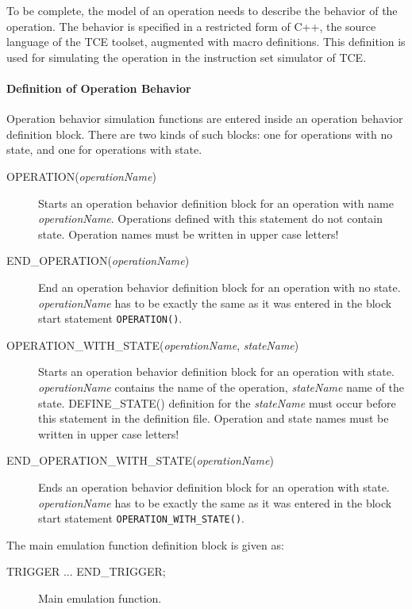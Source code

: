 \documentclass[twoside]{tceusermanual}
\begin{document}
To be complete, the model of an operation needs to describe the
behavior of the operation. The behavior is specified in a restricted
form of C++, the source language of the TCE toolset, augmented with
macro definitions.  This definition is used for simulating the
operation in the instruction set simulator of TCE.

\paragraph{Definition of Operation Behavior}

Operation behavior simulation functions are entered inside an operation
behavior definition block. There are two kinds of such blocks: one for
operations with no state, and one for operations with state.

\begin{description}
\item[OPERATION(\emph{operationName})] %
  Starts an operation behavior definition block for an operation with name 
  \emph{operationName}. Operations defined with this statement do not 
  contain state. Operation names must be written in upper case letters!
\item[END\_OPERATION(\emph{operationName})] %
  End an operation behavior definition block for an operation with no state.
  \emph{operationName} has to be exactly the same as it was entered in the
  block start statement \verb|OPERATION()|.
\item[OPERATION\_WITH\_STATE(\emph{operationName}, \emph{stateName})] %
  Starts an operation behavior definition block for an operation with state.
  \emph{operationName} contains the name of the operation, \emph{stateName}
  name of the state. DEFINE\_STATE() definition for the \emph{stateName}
must 
  occur before this statement in the definition file. Operation and state
  names must be written in upper case letters!
\item[END\_OPERATION\_WITH\_STATE(\emph{operationName})] %
  Ends an operation behavior definition block for an operation with state.
  \emph{operationName} has to be exactly the same as it was entered in the
  block start statement \verb|OPERATION_WITH_STATE()|.
\end{description}

The main emulation  function definition block is given as:
\begin{description}
\item[TRIGGER ... END\_TRIGGER;] %
  Main emulation function.

\end{description}
\end{document}
